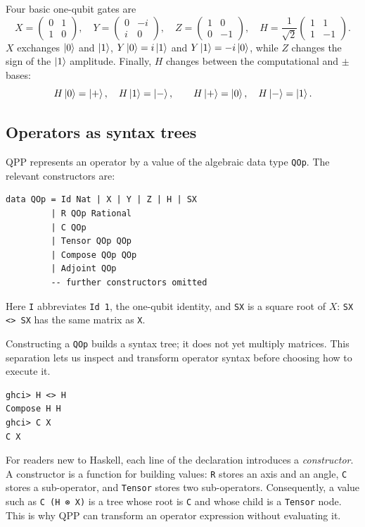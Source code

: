 \documentclass[11pt,a4paper]{article}
\theoremstyle{definition}
\begin{document}
Four basic one-qubit gates are
\[
  X=\begin{pmatrix}0&1\\1&0\end{pmatrix},\quad
  Y=\begin{pmatrix}0&-i\\i&0\end{pmatrix},\quad
  Z=\begin{pmatrix}1&0\\0&-1\end{pmatrix},\quad
  H=\frac1{\sqrt2}\begin{pmatrix}1&1\\1&-1\end{pmatrix}.
\]
$X$ exchanges $\left| 0 \right\rangle$ and $\left| 1 \right\rangle$,
$Y\left| 0 \right\rangle=i\left| 1 \right\rangle$ and $Y\left| 1 \right\rangle=-i\left| 0 \right\rangle$, while $Z$ changes the sign of the
$\left| 1 \right\rangle$ amplitude.  Finally, $H$ changes between the computational and
$\pm$ bases:
\[
  H\left| 0 \right\rangle=\left| + \right\rangle,\quad H\left| 1 \right\rangle=\left| - \right\rangle,\qquad
  H\left| + \right\rangle=\left| 0 \right\rangle,\quad H\left| - \right\rangle=\left| 1 \right\rangle.
\]

\subsection{Operators as syntax trees}

QPP represents an operator by a value of the algebraic data type \lstinline|QOp|.
The relevant constructors are:
\begin{lstlisting}
data QOp = Id Nat | X | Y | Z | H | SX
         | R QOp Rational
         | C QOp
         | Tensor QOp QOp
         | Compose QOp QOp
         | Adjoint QOp
         -- further constructors omitted
\end{lstlisting}
Here \lstinline|I| abbreviates \lstinline|Id 1|, the one-qubit identity, and
\lstinline|SX| is a square root of $X$: \lstinline|SX <> SX| has the same
matrix as \lstinline|X|.

Constructing a \lstinline|QOp| builds a syntax tree; it does not yet multiply
matrices.  This separation lets us inspect and transform operator syntax before
choosing how to execute it.
\begin{lstlisting}
ghci> H <> H
Compose H H
ghci> C X
C X
\end{lstlisting}
For readers new to Haskell, each line of the declaration introduces a
\emph{constructor}.  A constructor is a function for building values:
\lstinline|R| stores an axis and an angle, \lstinline|C| stores a
sub-operator, and \lstinline|Tensor| stores two sub-operators.  Consequently,
a value such as \lstinline|C (H ⊗ X)|
is a tree whose root is \lstinline|C| and whose child is a
\lstinline|Tensor| node.  This is why QPP can transform an operator expression
without evaluating it.
\end{document}
